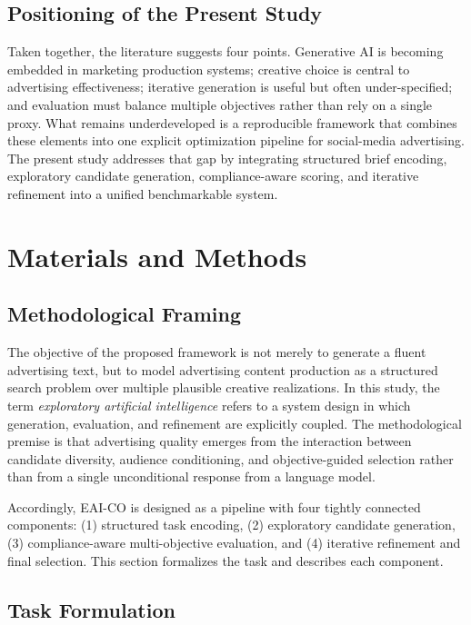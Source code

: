 \documentclass[applsci,article,submit,pdftex,moreauthors]{Definitions/mdpi}
\begin{document}
\subsection{Positioning of the Present Study}

Taken together, the literature suggests four points. Generative AI is becoming embedded in marketing production systems; creative choice is central to advertising effectiveness; iterative generation is useful but often under-specified; and evaluation must balance multiple objectives rather than rely on a single proxy. What remains underdeveloped is a reproducible framework that combines these elements into one explicit optimization pipeline for social-media advertising. The present study addresses that gap by integrating structured brief encoding, exploratory candidate generation, compliance-aware scoring, and iterative refinement into a unified benchmarkable system.

\section{Materials and Methods}

\subsection{Methodological Framing}

The objective of the proposed framework is not merely to generate a fluent advertising text, but to model advertising content production as a structured search problem over multiple plausible creative realizations. In this study, the term \emph{exploratory artificial intelligence} refers to a system design in which generation, evaluation, and refinement are explicitly coupled. The methodological premise is that advertising quality emerges from the interaction between candidate diversity, audience conditioning, and objective-guided selection rather than from a single unconditional response from a language model.

Accordingly, EAI-CO is designed as a pipeline with four tightly connected components: (1) structured task encoding, (2) exploratory candidate generation, (3) compliance-aware multi-objective evaluation, and (4) iterative refinement and final selection. This section formalizes the task and describes each component.

\subsection{Task Formulation}
\end{document}
